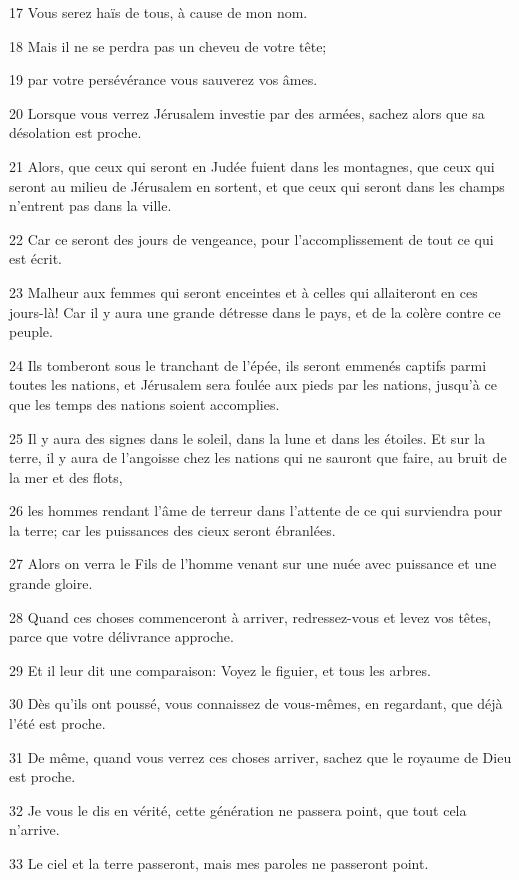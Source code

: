 \par 17 Vous serez haïs de tous, à cause de mon nom.
\par 18 Mais il ne se perdra pas un cheveu de votre tête;
\par 19 par votre persévérance vous sauverez vos âmes.
\par 20 Lorsque vous verrez Jérusalem investie par des armées, sachez alors que sa désolation est proche.
\par 21 Alors, que ceux qui seront en Judée fuient dans les montagnes, que ceux qui seront au milieu de Jérusalem en sortent, et que ceux qui seront dans les champs n'entrent pas dans la ville.
\par 22 Car ce seront des jours de vengeance, pour l'accomplissement de tout ce qui est écrit.
\par 23 Malheur aux femmes qui seront enceintes et à celles qui allaiteront en ces jours-là! Car il y aura une grande détresse dans le pays, et de la colère contre ce peuple.
\par 24 Ils tomberont sous le tranchant de l'épée, ils seront emmenés captifs parmi toutes les nations, et Jérusalem sera foulée aux pieds par les nations, jusqu'à ce que les temps des nations soient accomplies.
\par 25 Il y aura des signes dans le soleil, dans la lune et dans les étoiles. Et sur la terre, il y aura de l'angoisse chez les nations qui ne sauront que faire, au bruit de la mer et des flots,
\par 26 les hommes rendant l'âme de terreur dans l'attente de ce qui surviendra pour la terre; car les puissances des cieux seront ébranlées.
\par 27 Alors on verra le Fils de l'homme venant sur une nuée avec puissance et une grande gloire.
\par 28 Quand ces choses commenceront à arriver, redressez-vous et levez vos têtes, parce que votre délivrance approche.
\par 29 Et il leur dit une comparaison: Voyez le figuier, et tous les arbres.
\par 30 Dès qu'ils ont poussé, vous connaissez de vous-mêmes, en regardant, que déjà l'été est proche.
\par 31 De même, quand vous verrez ces choses arriver, sachez que le royaume de Dieu est proche.
\par 32 Je vous le dis en vérité, cette génération ne passera point, que tout cela n'arrive.
\par 33 Le ciel et la terre passeront, mais mes paroles ne passeront point.
